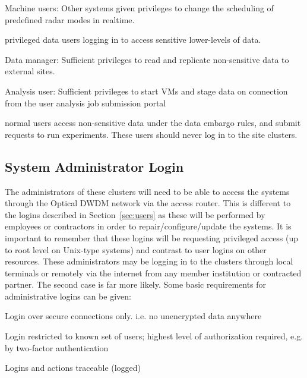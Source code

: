 \documentclass[12pt,a4paper]{article}
\begin{document}
\item Machine users: Other systems given privileges to change the scheduling of predefined radar modes in realtime. 


\item \EC privileged data users logging in to access sensitive lower-levels of data.

\item Data manager: Sufficient privileges to read and replicate non-sensitive data to external sites.

\item Analysis user: Sufficient privileges to start VMs and stage data on connection from the user analysis job submission portal
 
\item \EC normal users access non-sensitive data under the \EC data embargo rules, and submit requests to run experiments. These users should never log in to the site clusters.


\eitm

\subsection{System Administrator Login}
\label{sec:admin}


The administrators of these clusters will need to be able to access the \ED systems through the Optical DWDM network via the access router.
This is different to the logins described in Section~\ref{sec:users} as these will be performed by \EC employees or contractors
in order to repair/configure/update the systems.
It is important to remember that these logins will be requesting privileged access (up to root level on Unix-type systems) and contrast to user logins on other \einfra resources.
These administrators may be logging in to the clusters through local terminals or remotely via the internet from any \EC member institution
or contracted partner.
The second case is far more likely.
Some basic requirements for administrative logins can be given:
\bitm
\item Login over secure connections only. i.e. no unencrypted data anywhere

\item Login restricted to known set of users; highest level of authorization required, e.g. by two-factor authentication~\cite{two-factor}

\item Logins and actions traceable (logged)
\eitm
\end{document}
